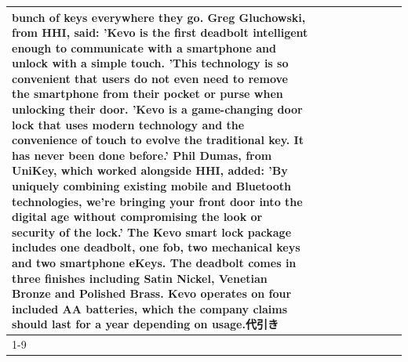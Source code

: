 \begin{table}[H]
\begin{tabular}{lllrlllll}
bunch of keys everywhere they go. Greg Gluchowski, from HHI, said: 'Kevo is the first deadbolt intelligent enough to communicate with a smartphone and unlock with a simple touch. 'This technology is so convenient that users do not even need to remove the smartphone from their pocket or purse when unlocking their door. 'Kevo is a game-changing door lock that uses modern technology and the convenience of touch to evolve the traditional key. It has never been done before.' Phil Dumas, from UniKey, which worked alongside HHI, added: 'By uniquely combining existing mobile and Bluetooth technologies, we’re bringing your front door into the digital age without compromising the look or security of the lock.' The Kevo smart lock package includes one deadbolt, one fob, two mechanical keys and two smartphone eKeys. The deadbolt comes in three finishes including Satin Nickel, Venetian Bronze and Polished Brass. Kevo operates on four included AA batteries, which the company claims should last for a year depending on usage.代引き \\
\cline{1-9}

\end{tabular}
\end{table}
